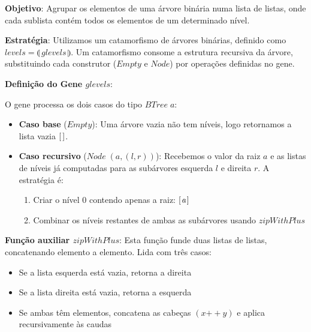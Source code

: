 \documentclass[11pt, a4paper, fleqn]{article}
\newcommand{\Conid}[1]{\mathit{#1}}
\newcommand{\Varid}[1]{\mathit{#1}}
\begin{document}
\textbf{Objetivo}: Agrupar os elementos de uma árvore binária numa lista de listas, onde cada sublista contém todos os elementos de um determinado nível.

\textbf{Estratégia}: Utilizamos um catamorfismo de árvores binárias, definido como \ensuremath{\Varid{levels}\mathrel{=}\llparenthesis\, \Varid{glevels}\,\rrparenthesis}. Um catamorfismo consome a estrutura recursiva da árvore, substituindo cada construtor (\ensuremath{\Conid{Empty}} e \ensuremath{\Conid{Node}}) por operações definidas no gene.

\textbf{Definição do Gene \ensuremath{\Varid{glevels}}}:

O gene processa os dois casos do tipo \ensuremath{\Conid{BTree}\;\Varid{a}}:

\begin{itemize} 

\item \textbf{Caso base} (\ensuremath{\Conid{Empty}}): Uma árvore vazia não tem níveis, logo retornamos a lista vazia \ensuremath{[\mskip1.5mu \mskip1.5mu]}.

\item \textbf{Caso recursivo} (\ensuremath{\Conid{Node}\;(\Varid{a},(\Varid{l},\Varid{r}))}): Recebemos o valor da raiz \ensuremath{\Varid{a}} e as listas de níveis já computadas para as subárvores esquerda \ensuremath{\Varid{l}} e direita \ensuremath{\Varid{r}}. A estratégia é:
  \begin{enumerate}
    \item Criar o nível 0 contendo apenas a raiz: \ensuremath{[\mskip1.5mu \Varid{a}\mskip1.5mu]}
    \item Combinar os níveis restantes de ambas as subárvores usando \ensuremath{\Varid{zipWithPlus}}
  \end{enumerate}

\end{itemize}

\textbf{Função auxiliar \ensuremath{\Varid{zipWithPlus}}}: Esta função funde duas listas de listas, concatenando elemento a elemento. Lida com três casos:
\begin{itemize}
  \item Se a lista esquerda está vazia, retorna a direita
  \item Se a lista direita está vazia, retorna a esquerda  
  \item Se ambas têm elementos, concatena as cabeças \ensuremath{(\Varid{x}\mathbin{+\!\!+}\Varid{y})} e aplica recursivamente às caudas
\end{itemize}
\end{document}
